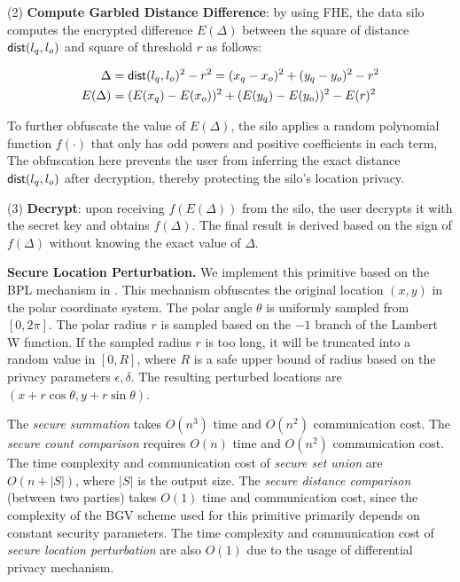 (2) \textbf{Compute Garbled Distance Difference}: by using FHE, the data silo computes the encrypted difference $E(\Delta)$ between the square of distance $\textsf{dist}(l_q, l_o)$ and square of threshold $r$ as follows:
\begin{small}
\begin{align*}
    \Delta &= \textsf{dist}(l_q, l_o)^2 - r^2 = (x_q-x_o)^2 + (y_q-y_o)^2 - r^2 \\
    E(\Delta) &= (E(x_q)-E(x_o))^2 + (E(y_q)-E(y_o))^2 - E(r)^2
\end{align*}
\end{small}
To further obfuscate the value of $E(\Delta)$, the silo applies a random polynomial function $f(\cdot)$ that only has odd powers and positive coefficients in each term,
The obfuscation here prevents the user from inferring the exact distance $\textsf{dist}(l_q, l_o)$ after decryption, thereby protecting the silo's location privacy.

(3) \textbf{Decrypt}: upon receiving $f(E(\Delta))$ from the silo, the user decrypts it with the secret key and obtains $f(\Delta)$. The final result is derived based on the sign of $f(\Delta)$ without knowing the exact value of $\Delta$.

\textbf{Secure Location Perturbation.}
We implement this primitive based on the BPL mechanism in \cite{DBLP:journals/corr/abs-2312-12012}.
This mechanism obfuscates the original location $(x, y)$ in the polar coordinate system.
The polar angle $\theta$ is uniformly sampled from $[0, 2\pi]$.
The polar radius $r$ is sampled based on the $-1$ branch of the Lambert W function.
If the sampled radius $r$ is too long, it will be truncated into a random value in $[0, R]$,
where $R$ is a safe upper bound of radius based on the privacy parameters $\epsilon,\delta$. 
The resulting perturbed locations are $(x+r\cos{\theta}, y+r\sin{\theta})$.

The \textit{secure summation} takes $O(n^3)$ time and $O(n^2)$ communication cost.
The \textit{secure count comparison} requires $O(n)$ time and $O(n^2)$ communication cost.
The time complexity and communication cost of \textit{secure set union} are $O(n+|S|)$,
where $|S|$ is the output size.
The \textit{secure distance comparison} (between two parties) takes $O(1)$ time and communication cost,
since the complexity of the BGV scheme \cite{DBLP:journals/csur/AcarAUC18} used for this primitive primarily depends on constant security parameters. 
The time complexity and communication cost of \textit{secure location perturbation} are also $O(1)$ due to the usage of differential privacy mechanism.


